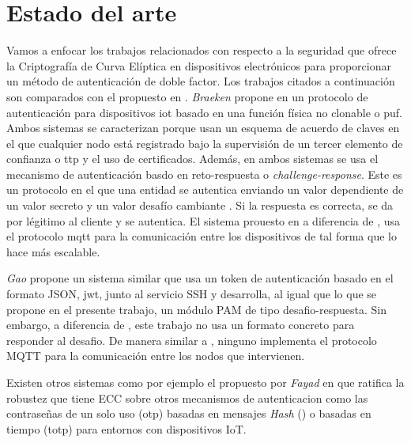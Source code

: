 \cleardoublepage

\chapter{Estado del arte}

Vamos a enfocar los trabajos relacionados con respecto a la seguridad que ofrece la Criptografía de Curva Elíptica en dispositivos
electrónicos para proporcionar un método de autenticación de doble factor. Los trabajos citados a continuación son comparados
con el propuesto en \cite{multipauthpaper}. \textit{Braeken} propone en \cite{braeken2018puf} un protocolo de autenticación para 
dispositivos \acrfull{iot} basado en una función física no clonable o \acrfull{puf}. Ambos sistemas se caracterizan porque usan
un esquema de acuerdo de claves en el que cualquier nodo está registrado bajo la supervisión de un tercer elemento de 
confianza o \acrfull{ttp} y el uso de certificados. Además, en ambos sistemas se usa el mecanismo de autenticación basdo en 
reto-respuesta o \textit{challenge-response}. Este es un protocolo en el que una entidad se autentica enviando un valor dependiente
de un valor secreto y un valor desafío cambiante \cite{van2014encyclopedia}. Si la respuesta es correcta, se da por légitimo al 
cliente y se autentica. El sistema prouesto en \cite{multipauthpaper} a diferencia de \cite{braeken2018puf}, usa el protocolo 
\acrshort{mqtt} para la comunicación entre los dispositivos de tal forma que lo hace más escalable. 

\textit{Gao} \cite{gao2020scitokens} propone un sistema similar que usa un token de autenticación basado en el formato JSON, 
\acrfull{jwt}, junto al servicio SSH y desarrolla, al igual que lo que se propone en el presente trabajo, un módulo PAM de tipo
desafio-respuesta. Sin embargo, a diferencia de \cite{gao2020scitokens}, este trabajo no usa un formato concreto para responder
al desafio. De manera similar a \cite{braeken2018puf}, ninguno implementa el protocolo MQTT para la comunicación  entre los 
nodos que intervienen. 

Existen otros sistemas como por ejemplo el propuesto por \textit{Fayad} en \cite{fayad2020secure} que ratifica la robustez que 
tiene ECC sobre otros mecanismos de autenticacion como las contraseñas de un solo uso (\acrshort{otp}) basadas en mensajes 
\textit{Hash} () o basadas en tiempo (\acrshort{totp}) para entornos con dispositivos IoT. 

